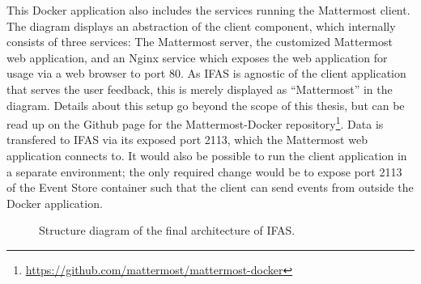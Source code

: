 This Docker application also includes the services running the Mattermost client.
The diagram displays an abstraction of the client component, which internally consists of three services:
The Mattermost server, the customized Mattermost web application, and an Nginx service which exposes the web application for usage via a web browser to port 80.
As \ac{IFAS} is agnostic of the client application that serves the user feedback, this is merely displayed as ``Mattermost'' in the diagram.
Details about this setup go beyond the scope of this thesis, but can be read up on the Github page for the Mattermost-Docker repository\footnote{\url{https://github.com/mattermost/mattermost-docker}}.
Data is transfered to \ac{IFAS} via its exposed port 2113, which the Mattermost web application connects to.
It would also be possible to run the client application in a separate environment; the only required change would be to expose port 2113 of the Event Store container such that the client can send events from outside the Docker application.

\begin{figure}[ht]
        \caption{Structure diagram of the final architecture of \ac{IFAS}.}
        \label{figure:design:architecture}
\end{figure}

